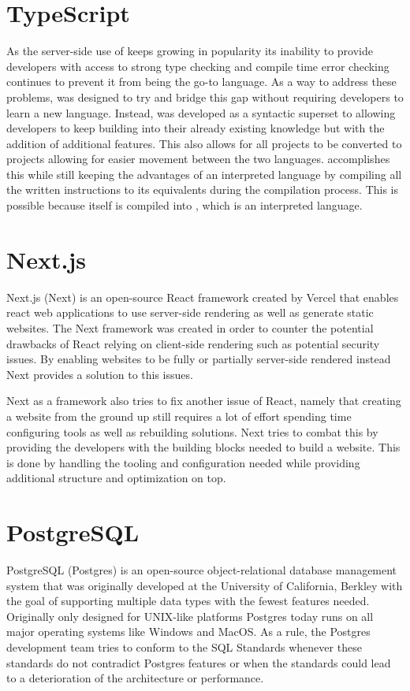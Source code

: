 \section*{TypeScript}
As the server-side use of \javascript{} keeps growing in popularity its inability to provide developers with access to strong type checking and compile time error checking continues to prevent it from being the go-to language.
As a way to address these problems, \typescript{} was designed to try and bridge this gap without requiring developers to learn a new language.
Instead, \typescript{} was developed as a syntactic superset to \javascript{} allowing developers to keep building into their already existing knowledge but with the addition of additional features. 
This also allows for all \javascript{} projects to be converted to \typescript{} projects allowing for easier movement between the two languages\cite{TypeScript}. 
\typescript{} accomplishes this while still keeping the advantages of an interpreted language by compiling all the written instructions to its \javascript{} equivalents during the compilation process. 
This is possible because \typescript{} itself is compiled into \javascript{}, which is an interpreted language. 

\section*{Next.js}
Next.js (Next) is an open-source React framework created by Vercel that enables react web applications to use server-side rendering as well as generate static websites. The Next framework was created in order to counter the potential drawbacks of React relying on client-side rendering such as potential security issues. By enabling websites to be fully or partially server-side rendered instead Next provides a solution to this issues\cite {Nextjs_Docks}. 

Next as a framework also tries to fix another issue of React, namely that creating a website from the ground up still requires a lot of effort spending time configuring tools as well as rebuilding solutions. 
Next tries to combat this by providing the developers with the building blocks needed to build a website.
This is done by handling the tooling and configuration needed while providing additional structure and optimization on top\cite{Nextjs_Docks}.


\section*{PostgreSQL}
PostgreSQL (Postgres) is an open-source object-relational database management system that was originally developed at the University of California, Berkley with the goal of supporting multiple data types with the fewest features needed. Originally only designed for UNIX-like platforms Postgres today runs on all major operating systems like Windows and MacOS\cite{Postgres_Docs}.
As a rule, the Postgres development team tries to conform to the SQL Standards whenever these standards do not contradict Postgres features or when the standards could lead to a deterioration of the architecture or performance\cite{Postgres_Docs}. 

